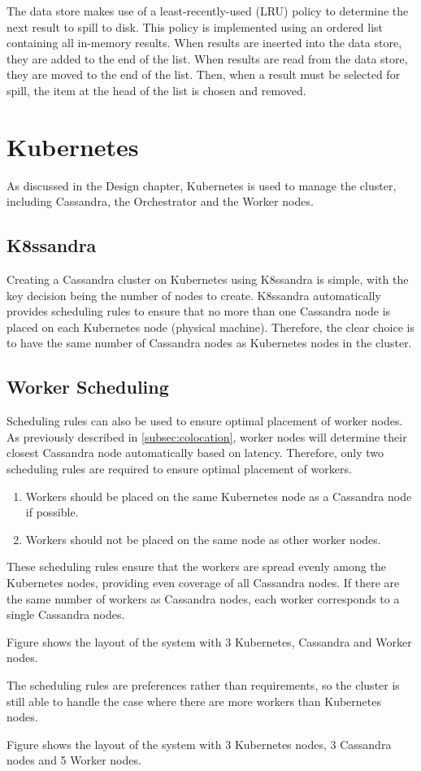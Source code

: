 The data store makes use of a least-recently-used (LRU) policy to determine the next result to spill to disk. This policy is implemented using an ordered list containing all in-memory results. When results are inserted into the data store, they are added to the end of the list. When results are read from the data store, they are moved to the end of the list. Then, when a result must be selected for spill, the item at the head of the list is chosen and removed.

\section{Kubernetes}
As discussed in the Design chapter, Kubernetes is used to manage the cluster, including Cassandra, the Orchestrator and the Worker nodes.

\subsection{K8ssandra}
Creating a Cassandra cluster on Kubernetes using K8ssandra is simple, with the key decision being the number of nodes to create. K8ssandra automatically provides scheduling rules to ensure that no more than one Cassandra node is placed on each Kubernetes node (physical machine). Therefore, the clear choice is to have the same number of Cassandra nodes as Kubernetes nodes in the cluster.

\subsection{Worker Scheduling}
Scheduling rules can also be used to ensure optimal placement of worker nodes. As previously described in \ref{subsec:colocation}, worker nodes will determine their closest Cassandra node automatically based on latency. Therefore, only two scheduling rules are required to ensure optimal placement of workers.
\begin{enumerate}
	\item Workers should be placed on the same Kubernetes node as a Cassandra node if possible.
	\item Workers should not be placed on the same node as other worker nodes.
\end{enumerate}

These scheduling rules ensure that the workers are spread evenly among the Kubernetes nodes, providing even coverage of all Cassandra nodes. If there are the same number of workers as Cassandra nodes, each worker corresponds to a single Cassandra nodes.

Figure  shows the layout of the system with 3 Kubernetes, Cassandra and Worker nodes.


The scheduling rules are preferences rather than requirements, so the cluster is still able to handle the case where there are more workers than Kubernetes nodes.

Figure  shows the layout of the system with 3 Kubernetes nodes, 3 Cassandra nodes and 5 Worker nodes.


